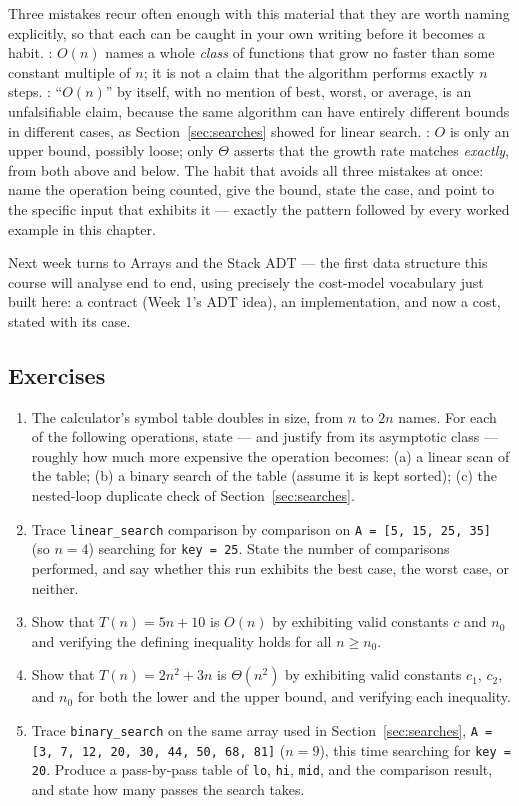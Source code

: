 \documentclass[11pt]{article}
\begin{document}
Three mistakes recur often enough with this material that they are worth
naming explicitly, so that each can be caught in your own writing before it
becomes a habit. : $O(n)$
names a whole \emph{class} of functions that grow no faster than some
constant multiple of $n$; it is not a claim that the algorithm performs
exactly $n$ steps. : ``$O(n)$'' by itself,
with no mention of best, worst, or average, is an unfalsifiable claim,
because the same algorithm can have entirely different bounds in different
cases, as Section~\ref{sec:searches} showed for linear search. : $O$ is only an upper bound, possibly loose; only
$\Theta$ asserts that the growth rate matches \emph{exactly}, from both
above and below. The habit that avoids all three mistakes at once: name the
operation being counted, give the bound, state the case, and point to the
specific input that exhibits it --- exactly the pattern followed by every
worked example in this chapter.

Next week turns to Arrays and the Stack ADT --- the first data structure
this course will analyse end to end, using precisely the cost-model
vocabulary just built here: a contract (Week 1's ADT idea), an
implementation, and now a cost, stated with its case.

\subsection*{Exercises}

\begin{enumerate}
  \item The calculator's symbol table doubles in size, from $n$ to $2n$
    names. For each of the following operations, state --- and justify from
    its asymptotic class --- roughly how much more expensive the operation
    becomes: (a) a linear scan of the table; (b) a binary search of the
    table (assume it is kept sorted); (c) the nested-loop duplicate check of
    Section~\ref{sec:searches}.
  \item Trace \texttt{linear\_search} comparison by comparison on
    \texttt{A = [5, 15, 25, 35]} (so $n = 4$) searching for
    \texttt{key = 25}. State the number of comparisons performed, and say
    whether this run exhibits the best case, the worst case, or neither.
  \item Show that $T(n) = 5n + 10$ is $O(n)$ by exhibiting valid constants
    $c$ and $n_0$ and verifying the defining inequality holds for all
    $n \geq n_0$.
  \item Show that $T(n) = 2n^2 + 3n$ is $\Theta(n^2)$ by exhibiting valid
    constants $c_1$, $c_2$, and $n_0$ for both the lower and the upper
    bound, and verifying each inequality.
  \item Trace \texttt{binary\_search} on the same array used in
    Section~\ref{sec:searches}, \texttt{A = [3, 7, 12, 20, 30, 44, 50, 68,
    81]} ($n = 9$), this time searching for \texttt{key = 20}. Produce a
    pass-by-pass table of \texttt{lo}, \texttt{hi}, \texttt{mid}, and the
    comparison result, and state how many passes the search takes.
\end{enumerate}
\end{document}
